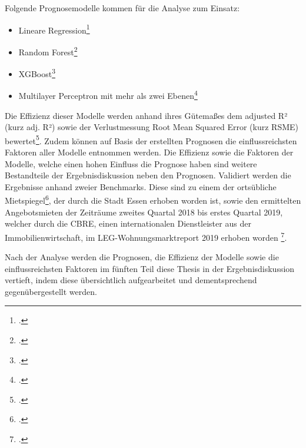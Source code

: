Folgende Prognosemodelle kommen für die Analyse zum Einsatz:

\begin{itemize}
    \item Lineare Regression\footcite[Vgl. ][]{Verbeek2017}
    \item Random Forest\footcite[Vgl. ][]{Breiman2001}
    \item XGBoost\footcite[Vgl. ][]{Chen2016}
    \item Multilayer Perceptron mit mehr als zwei Ebenen\footcite[Vgl. ][]{Brause1991, Goodfellow2017} 
\end{itemize}

Die Effizienz dieser Modelle werden anhand ihres Gütemaßes dem adjusted R² (kurz adj. R²) 
sowie der Verlustmessung Root Mean Squared Error (kurz RSME) bewertet\footcite[Vgl. ][]{Goodfellow2017,Larose2015}.
Zudem können auf Basis der erstellten Prognosen die einflussreichsten Faktoren aller 
Modelle entnommen werden. Die Effizienz sowie die Faktoren der Modelle, welche einen 
hohen Einfluss die Prognose haben sind weitere Bestandteile der Ergebnisdiskussion neben 
den Prognosen.
\newpage
Validiert werden die Ergebnisse anhand zweier Benchmarks. Diese sind zu einem der 
ortsübliche Mietspiegel\footcite[Vgl. ][]{AmtfurStadterneuerungundBodenmanagement-StadtEssen2020}, 
der durch die Stadt Essen erhoben worden ist, sowie den 
ermittelten Angebotsmieten der Zeiträume zweites Quartal 2018 bis erstes Quartal 2019, 
welcher durch die CBRE, einen internationalen Dienstleister aus der Immobilienwirtschaft, 
im LEG-Wohnungsmarktreport 2019 erhoben worden \footcite[Vgl. ][]{LEG2019}.  

Nach der Analyse werden die Prognosen, die Effizienz der Modelle sowie die einflussreichsten 
Faktoren im fünften Teil diese Thesis in der Ergebnisdiskussion vertieft, indem diese 
übersichtlich aufgearbeitet und dementsprechend gegenübergestellt werden. 
